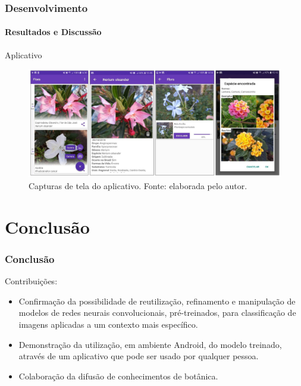 \documentclass{beamer}
\begin{document}
	\begin{frame}[t]
    		\frametitle{Desenvolvimento}
    		\framesubtitle{Resultados e Discussão}		
		Aplicativo
		\begin{figure}[hbt]
      	 		\begin{center}
      			\includegraphics[height=.45 \textwidth]{img/print1.png}
      			\end{center}
      			\caption{Capturas de tela do aplicativo. Fonte: elaborada pelo autor.}
      			\end{figure}	
    \end{frame}  
    
    \section{Conclusão}
      \begin{frame}[t]
      \frametitle{Conclusão}
      Contribuições:
      \begin{itemize}
      	\item<1-> Confirmação da possibilidade de reutilização, refinamento e manipulação de modelos de redes neurais convolucionais, pré-treinados, para classificação de imagens aplicadas a um contexto mais específico.
		\item<2-> Demonstração da utilização, em ambiente Android, do modelo treinado, através de um aplicativo que pode ser usado por qualquer pessoa.
		\item<3-> Colaboração da difusão de conhecimentos de botânica.
      \end{itemize}       
        
    \end{frame}
    
\end{document}

